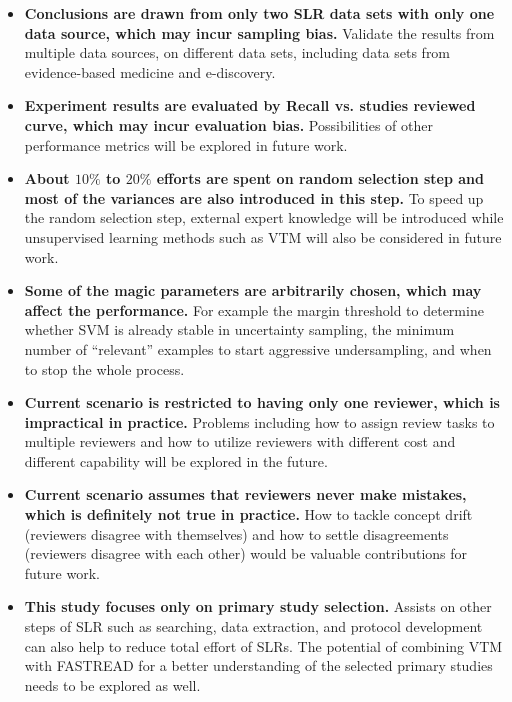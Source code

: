 \documentclass[final,twocolumn,5p]{elsarticle}
\theoremstyle{break}
\begin{document}
\begin{itemize}

\item
{\bf Conclusions are drawn from only two SLR data sets with only one data source, which may incur sampling bias.} Validate the results from multiple data sources, on different data sets, including data sets from evidence-based medicine and e-discovery.

\item
{\bf Experiment results are evaluated by \textbf{Recall} vs. \textbf{studies reviewed} curve, which may incur evaluation bias.} Possibilities of other performance metrics will be explored in future work.

\item
{\bf About $10\%$ to $20\%$ efforts are spent on random selection step and most of the variances are also introduced in this step.} To speed up the random selection step, external expert knowledge will be introduced while unsupervised learning methods such as VTM will also be considered in future work. 

\item
{\bf Some of the magic parameters are arbitrarily chosen, which may affect the performance.} For example the margin threshold to determine whether SVM is already stable in uncertainty sampling, the minimum number of ``relevant'' examples to start aggressive undersampling, and when to stop the whole process.

\item
{\bf Current scenario is restricted to having only one reviewer, which is impractical in practice.} Problems including how to assign review tasks to multiple reviewers and how to utilize reviewers with different cost and different capability will be explored in the future.

\item
{\bf Current scenario assumes that reviewers never make mistakes, which is definitely not true in practice.} How to tackle concept drift (reviewers disagree with themselves) and how to settle disagreements (reviewers disagree with each other) would be valuable contributions for future work.

\item
{\bf This study focuses only on primary study selection.} Assists on other steps of SLR such as searching, data extraction, and protocol development can also help to reduce total effort of SLRs. The potential of combining VTM with FASTREAD for a better understanding of the selected primary studies needs to be explored as well.

\end{itemize}
\end{document}
